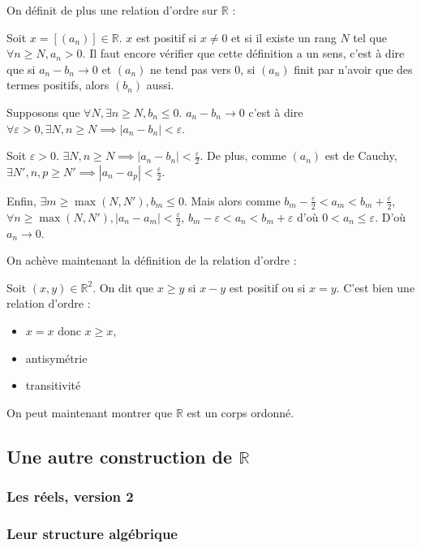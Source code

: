 On définit de plus une relation d'ordre sur $\mathbb{R}$ :
\begin{defini}
Soit $x = [(a_n)] \in \mathbb{R}$. $x$ est positif si $x\neq 0$ et si il existe un rang $N$ tel que $\forall n \geq N, a_n > 0$. 
\tcblower
Il faut encore vérifier que cette définition a un sens, c'est à dire que si $a_n-b_n \to 0$ et $(a_n)$ ne tend pas vers 0, si $(a_n)$ finit par n'avoir que des termes positifs, alors $(b_n)$ aussi. 

Supposons que $\forall N, \exists n \geq N, b_n \leq 0$. $a_n-b_n \to 0$ c'est à dire $\forall \varepsilon >0, \exists N, n \geq N \implies  |a_n-b_n|<\varepsilon$.

Soit $\varepsilon >0$. $\exists N, n \geq N \implies  |a_n-b_n|<\frac{\varepsilon}{2}$. De plus, comme $(a_n)$ est de Cauchy, $\exists N', n, p \geq N' \implies |a_{n}-a_{p}| < \frac{\varepsilon}{2}$.

Enfin, $\exists m \geq \max(N, N'), b_m \leq 0$.  Mais alors comme $b_{m}- \frac{\varepsilon}{2}<a_m<b_{m}+ \frac{\varepsilon}{2}$, $\forall n \geq \max(N, N'), |a_n-a_m|< \frac{\varepsilon}{2}$, $b_m-\varepsilon<a_n<b_m+\varepsilon$ d'où $0<a_n\leq \varepsilon$. D'où $a_n \to 0$. 
\end{defini}

On achève maintenant la définition de la relation d'ordre :
\begin{defini}
    Soit $(x,y)\in \mathbb{R}^2$. On dit que $x\geq y$ si $x-y$ est positif ou si $x=y$.
    \tcblower
    C'est bien une relation d'ordre :
    \begin{itemize}
        \item $x=x$ donc $x\geq x$,
        \item antisymétrie
        \item transitivité 
    \end{itemize}
\end{defini}

On peut maintenant montrer que $\mathbb{R}$ est un corps ordonné.

\subsection{Une autre construction de $\mathbb{R}$}
\subsubsection{Les réels, version 2}
\subsubsection{Leur structure algébrique}
